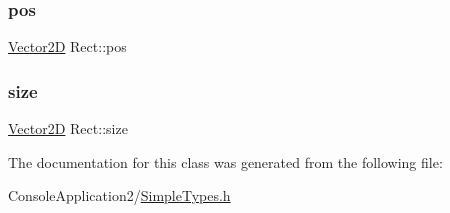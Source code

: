 \subsubsection{\texorpdfstring{pos}{pos}}
{\footnotesize\ttfamily \hyperlink{class_vector2_d}{Vector2D} Rect\+::pos}

\hypertarget{class_rect_a1e41d6169d2df56206b3c671480f6e9c}{}\label{class_rect_a1e41d6169d2df56206b3c671480f6e9c} 
\subsubsection{\texorpdfstring{size}{size}}
{\footnotesize\ttfamily \hyperlink{class_vector2_d}{Vector2D} Rect\+::size}



The documentation for this class was generated from the following file\+:\begin{DoxyCompactItemize}
\item 
Console\+Application2/\hyperlink{_simple_types_8h}{Simple\+Types.\+h}\end{DoxyCompactItemize}
